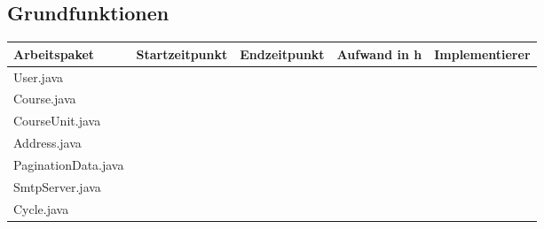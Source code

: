 \documentclass[12pt,a4paper]{scrreprt}
\begin{document}
\begin{landscape}
   	\subsection{Grundfunktionen}
   	\begin{tabular}{|p{10cm}|p{4cm}|p{3cm}|p{3cm}|p{3cm}|}
    	\hline  \textbf{Arbeitspaket} & \textbf{Startzeitpunkt} & \textbf{Endzeitpunkt} & \textbf{Aufwand in h} & \textbf{Implementierer} \\ 
    	\hline   User.java                        &                            &                             &                     &\\ 
    	\hline   Course.java                      &                            &                             &                     &\\ 
    	\hline   CourseUnit.java                  &                            &                             &                     &\\ 
    	\hline   Address.java                     &                            &                             &                     &\\ 
    	\hline   PaginationData.java              &                            &                             &                     &\\ 
       	\hline   SmtpServer.java                  &                            &                             &                     &\\  
       	\hline   Cycle.java                       &                            &                             &                     &\\   
    	\hline 
   	\end{tabular} \ \\
   	\ \\
 

\end{landscape}
\end{document}
